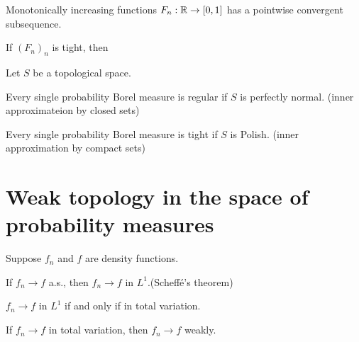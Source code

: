 \documentclass{../../large}
\begin{document}
\begin{prb}
\end{prb}

\begin{prb}
\end{prb}

\begin{prb}
\end{prb}

\begin{prb}
\begin{parts}
\item Monotonically increasing functions $F_n:\mathbb{R}\to[0,1]$ has a pointwise convergent subsequence.
\item If $(F_n)_n$ is tight, then
\end{parts}
\end{prb}






\begin{prb}
Let $S$ be a topological space.
\begin{parts}
\item Every single probability Borel measure is regular if $S$ is perfectly normal. (inner approximateion by closed sets)
\item Every single probability Borel measure is tight if $S$ is Polish. (inner approximation by compact sets)
\end{parts}
\end{prb}





\section{Weak topology in the space of probability measures}


\begin{prb}
Suppose $f_n$ and $f$ are density functions.
\begin{parts}
\item If $f_n\to f$ a.s., then $f_n\to f$ in $L^1$.\hfill(Scheff\'e's theorem)
\item $f_n\to f$ in $L^1$ if and only if in total variation.
\item If $f_n\to f$ in total variation, then $f_n\to f$ weakly.
\end{parts}
\end{prb}
\end{document}
